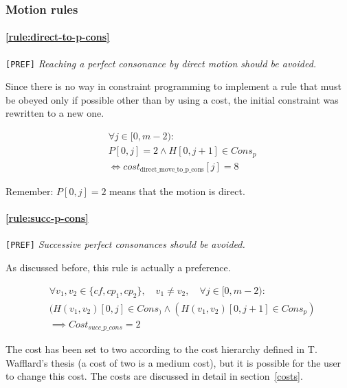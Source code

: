 \subsubsection{Motion rules}
\paragraph{\hspace{.6cm}\ref{rule:direct-to-p-cons}} \greendots \texttt{[PREF]} \textit{Reaching a perfect consonance by direct motion should be avoided.}

    Since there is no way in constraint programming to implement a rule that must be obeyed only if possible other than by using a cost, the initial constraint was rewritten to a new one.

    \begin{equation} \begin{aligned}
    &\forall j \in [0, m-2) :\\
    &P[0, j] = 2 \land H[0, j+1] \in Cons_{p} \\
    &\iff cost_{\text{{direct\_move\_to\_p\_cons}}}[j] = 8
    \end{aligned} \end{equation}

    Remember: $P[0,j] = 2$ means that the motion is direct.
    
\paragraph{\hspace{.6cm}\ref{rule:succ-p-cons}} \texttt{[PREF]} \textit{Successive perfect consonances should be avoided.}

    As discussed before, this rule is actually a preference.

    \begin{equation} \begin{aligned}
    &\forall v_1, v_2 \in \{cf, cp_1, cp_2\}, \quad v_1 \neq v_2, \quad \forall j \in [0, m-2) \colon\\
    &(H(v_1,v_2)[0, j] \in Cons_) \land (H(v_1,v_2)[0, j+1] \in Cons_p)\\
    &\implies Cost_{succ\_p\_cons} = 2
    \end{aligned} \end{equation}

    The cost has been set to two according to the cost hierarchy defined in T. Wafflard's thesis (a cost of two is a medium cost), but it is possible for the user to change this cost. The costs are discussed in detail in section~\ref{costs}.
    
